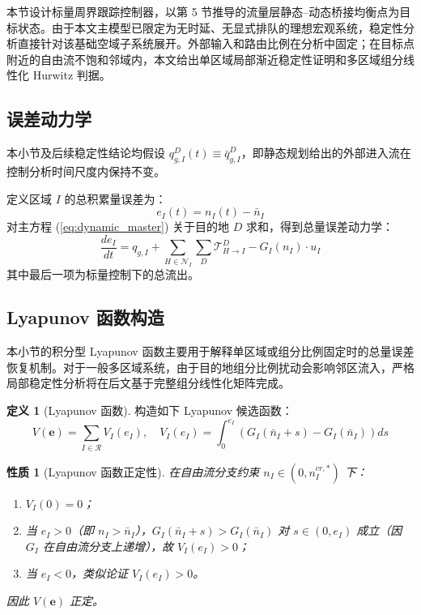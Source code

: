 \documentclass[a4paper,12pt]{article}
\theoremstyle{plain}
\newtheorem{property}[theorem]{性质}
\theoremstyle{definition}
\newtheorem{definition}[theorem]{定义}
\theoremstyle{remark}
\begin{document}
本节设计标量周界跟踪控制器，以第 5 节推导的流量层静态--动态桥接均衡点为目标状态。由于本文主模型已限定为无时延、无显式排队的理想宏观系统，稳定性分析直接针对该基础空域子系统展开。外部输入和路由比例在分析中固定；在目标点附近的自由流不饱和邻域内，本文给出单区域局部渐近稳定性证明和多区域组分线性化 Hurwitz 判据。

\subsection{误差动力学}

本小节及后续稳定性结论均假设 $q_{g,I}^D(t)\equiv\bar q_{g,I}^D$，即静态规划给出的外部进入流在控制分析时间尺度内保持不变。

定义区域 $I$ 的总积累量误差为：
\begin{equation}\label{eq:error_def}
    e_I(t) = n_I(t) - \bar{n}_I
\end{equation}
对主方程 (\ref{eq:dynamic_master}) 关于目的地 $D$ 求和，得到总量误差动力学：
\begin{equation}\label{eq:error_dynamics}
    \frac{de_I}{dt} = q_{g,I} + \sum_{H \in \mathcal{N}_I} \sum_D \mathcal{T}_{H \to I}^D - G_I(n_I) \cdot u_I
\end{equation}
其中最后一项为标量控制下的总流出。

\subsection{Lyapunov 函数构造}

本小节的积分型 Lyapunov 函数主要用于解释单区域或组分比例固定时的总量误差恢复机制。对于一般多区域系统，由于目的地组分比例扰动会影响邻区流入，严格局部稳定性分析将在后文基于完整组分线性化矩阵完成。

\begin{definition}[Lyapunov 函数]\label{def:lyapunov}
构造如下 Lyapunov 候选函数：
\begin{equation}\label{eq:lyapunov}
    V(\bm{e}) = \sum_{I \in \mathcal{R}} V_I(e_I), \quad V_I(e_I) = \int_0^{e_I} \left( G_I(\bar{n}_I + s) - G_I(\bar{n}_I) \right) ds
\end{equation}
\end{definition}

\begin{property}[Lyapunov 函数正定性]\label{prop:lyapunov_positive}
在自由流分支约束 $n_I \in (0, n_I^{cr,*})$ 下：
\begin{enumerate}
    \item $V_I(0) = 0$；
    \item 当 $e_I > 0$（即 $n_I > \bar{n}_I$），$G_I(\bar{n}_I + s) > G_I(\bar{n}_I)$ 对 $s \in (0, e_I)$ 成立（因 $G_I$ 在自由流分支上递增），故 $V_I(e_I) > 0$；
    \item 当 $e_I < 0$，类似论证 $V_I(e_I) > 0$。
\end{enumerate}
因此 $V(\bm{e})$ 正定。
\end{property}
\end{document}
